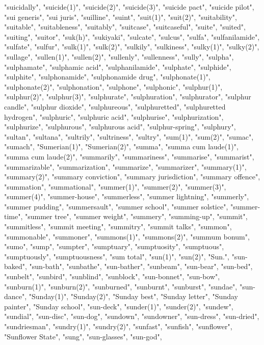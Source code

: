 "suicidally",
"suicide(1)",
"suicide(2)",
"suicide(3)",
"suicide pact",
"suicide pilot",
"sui generis",
"sui juris",
"suilline",
"suint",
"suit(1)",
"suit(2)",
"suitability",
"suitable",
"suitableness",
"suitably",
"suitcase",
"suitcaseful",
"suite",
"suited",
"suiting",
"suitor",
"suk(h)",
"sukiyaki",
"sulcate",
"sulcus",
"sulfa",
"sulfanilamide",
"sulfate",
"sulfur",
"sulk(1)",
"sulk(2)",
"sulkily",
"sulkiness",
"sulky(1)",
"sulky(2)",
"sullage",
"sullen(1)",
"sullen(2)",
"sullenly",
"sullenness",
"sully",
"sulpha",
"sulphamate",
"sulphamic acid",
"sulphanilamide",
"sulphate",
"sulphide",
"sulphite",
"sulphonamide",
"sulphonamide drug",
"sulphonate(1)",
"sulphonate(2)",
"sulphonation",
"sulphone",
"sulphonic",
"sulphur(1)",
"sulphur(2)",
"sulphur(3)",
"sulphurate",
"sulphuration",
"sulphurator",
"sulphur candle",
"sulphur dioxide",
"sulphureous",
"sulphuretted",
"sulphuretted hydrogen",
"sulphuric",
"sulphuric acid",
"sulphurise",
"sulphurization",
"sulphurize",
"sulphurous",
"sulphurous acid",
"sulphur-spring",
"sulphury",
"sultan",
"sultana",
"sultrily",
"sultriness",
"sultry",
"sum(1)",
"sum(2)",
"sumac",
"sumach",
"Sumerian(1)",
"Sumerian(2)",
"summa",
"summa cum laude(1)",
"summa cum laude(2)",
"summarily",
"summariness",
"summarise",
"summarist",
"summarizable",
"summarization",
"summarize",
"summarizer",
"summary(1)",
"summary(2)",
"summary conviction",
"summary jurisdiction",
"summary offence",
"summation",
"summational",
"summer(1)",
"summer(2)",
"summer(3)",
"summer(4)",
"summer-house",
"summerless",
"summer lightning",
"summerly",
"summer pudding",
"summersault",
"summer school",
"summer solstice",
"summer-time",
"summer tree",
"summer weight",
"summery",
"summing-up",
"summit",
"summitless",
"summit meeting",
"summitry",
"summit talks",
"summon",
"summonable",
"summoner",
"summons(1)",
"summons(2)",
"summum bonum",
"sumo",
"sump",
"sumpter",
"sumptuary",
"sumptuosity",
"sumptuous",
"sumptuously",
"sumptuousness",
"sum total",
"sun(1)",
"sun(2)",
"Sun.",
"sun-baked",
"sun-bath",
"sunbathe",
"sun-bather",
"sunbeam",
"sun-bear",
"sun-bed",
"sunbelt",
"sunbird",
"sunblind",
"sunblock",
"sun-bonnet",
"sun-bow",
"sunburn(1)",
"sunburn(2)",
"sunburned",
"sunburnt",
"sunburst",
"sundae",
"sun-dance",
"Sunday(1)",
"Sunday(2)",
"Sunday best",
"Sunday letter",
"Sunday painter",
"Sunday school",
"sun-deck",
"sunder(1)",
"sunder(2)",
"sundew",
"sundial",
"sun-disc",
"sun-dog",
"sundown",
"sundowner",
"sun-dress",
"sun-dried",
"sundriesman",
"sundry(1)",
"sundry(2)",
"sunfast",
"sunfish",
"sunflower",
"Sunflower State",
"sung",
"sun-glasses",
"sun-god",
